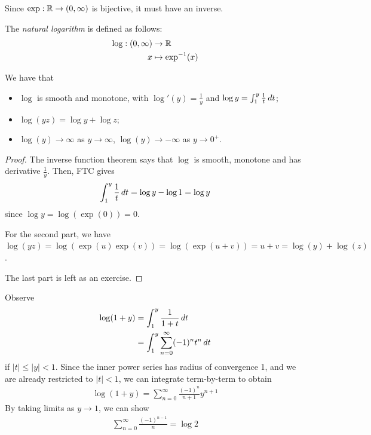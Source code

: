 \documentclass{../../template/note}
\begin{document}
    Since \(\exp: \mathbb R \to (0, \infty)\) is bijective, it must have an inverse.
    
    \begin{definition}
        The \emph{natural logarithm} is defined as follows:
        \begin{align*}
            \log: (0, \infty) &\to \mathbb R \\
            x &\mapsto \exp^{-1}(x)
        \end{align*}
    \end{definition}
    
    \begin{lemma}
        We have that
        \begin{itemize}
            \item \(\log\) is smooth and monotone, with \(\log'(y) = \frac 1 y\) and \(\log y = \int_1^y \frac 1 t \,d{t}\);
            \item \(\log(yz) = \log y + \log z\);
            \item \(\log(y) \to \infty\) as \(y \to \infty\), \(\log(y) \to -\infty\) as \(y \to 0^+\).
        \end{itemize}
    \end{lemma}
    
    \begin{proof}
        The inverse function theorem says that \(\log\) is smooth, monotone and has derivative \(\frac 1 y\). Then, FTC gives
        \begin{align*}
            \int_1^y \frac 1 t \,d{t} = \log y - \log 1 = \log y
        \end{align*}
        since \(\log y = \log(\exp(0)) = 0\).        

        For the second part, we have \(\log(yz) = \log(\exp(u)\exp(v)) = \log(\exp(u+v)) = u + v = \log(y) + \log(z)\).

        The last part is left as an exercise.
    \end{proof}
    
    \begin{remark*}
        Observe
        \begin{align*}
            \log(1+y) &= \int_1^y \frac 1{1+t} \,d{t} \\
            &= \int_1^y \sum_{n=0}^\infty (-1)^n t^n \,d{t}
        \end{align*}
        if \(|t| \leq |y| < 1\). Since the inner power series has radius of convergence 1, and we are already restricted to \(|t| < 1\), we can integrate term-by-term to obtain
        \begin{align*}
            \log(1+y) = \sum_{n=0}^\infty \frac{(-1)^n}{n+1}y^{n+1}
        \end{align*}
        By taking limits as \(y \to 1\), we can show
        \begin{align*}
            \sum_{n=0}^\infty \frac{(-1)^{n-1}}{n} = \log 2
        \end{align*}
    \end{remark*}
    
\end{document}
